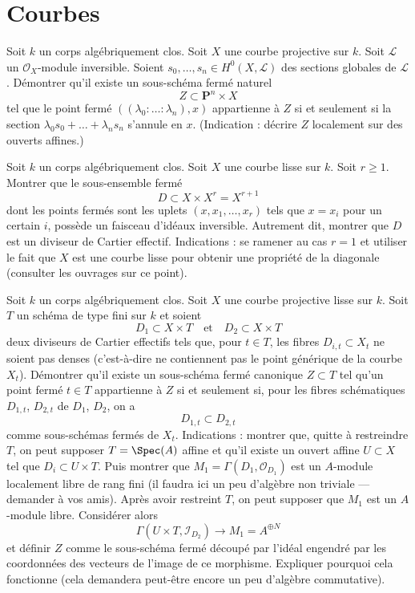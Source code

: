 \section{Courbes}
\label{section-curves}

\begin{exercise}
\label{exercise-closed-subset-vanshing}
Soit $k$ un corps algébriquement clos. Soit $X$ une courbe projective
sur $k$. Soit $\mathcal{L}$ un $\mathcal{O}_X$-module inversible.
Soient $s_0, \ldots, s_n \in H^0(X, \mathcal{L})$
des sections globales de $\mathcal{L}$.
Démontrer qu'il existe un sous-schéma fermé naturel
$$
Z \subset
\mathbf{P}^n \times X
$$
tel que le point fermé
$((\lambda_0 : \ldots : \lambda_n), x)$
appartienne à $Z$ si et seulement si la section
$\lambda_0 s_0 + \ldots + \lambda_n s_n$
s'annule en $x$. (Indication : décrire $Z$ localement sur des ouverts affines.)
\end{exercise}

\begin{exercise}
\label{exercise-diagonal-cartier}
Soit $k$ un corps algébriquement clos. Soit $X$ une courbe lisse sur $k$.
Soit $r \geq 1$. Montrer que le sous-ensemble fermé
$$
D \subset X \times X^r = X^{r + 1}
$$
dont les points fermés sont les uplets $(x, x_1, \ldots, x_r)$ tels que
$x = x_i$ pour un certain $i$, possède un faisceau d'idéaux inversible. Autrement dit,
montrer que
$D$ est un diviseur de Cartier effectif. Indications : se ramener au cas $r = 1$ et
utiliser le fait que $X$ est une courbe lisse pour obtenir une propriété de la diagonale
(consulter les ouvrages sur ce point).
\end{exercise}

\begin{exercise}
\label{exercise-one-divisor-in-another}
Soit $k$ un corps algébriquement clos. Soit $X$ une courbe projective lisse
sur $k$. Soit $T$ un schéma de type fini sur $k$ et soient
$$
D_1 \subset X \times T
\quad\text{et}\quad
D_2 \subset X \times T
$$
deux diviseurs de Cartier effectifs tels que, pour $t \in T$, les
fibres $D_{i, t} \subset X_t$ ne soient pas denses (c'est-à-dire ne contiennent pas
le point générique de la courbe $X_t$).
Démontrer qu'il existe un sous-schéma fermé canonique
$Z \subset T$ tel qu'un point fermé $t \in T$ appartienne à $Z$
si et seulement si, pour les fibres schématiques $D_{1, t}$, $D_{2, t}$
de $D_1$, $D_2$, on a
$$
D_{1, t} \subset D_{2, t}
$$
comme sous-schémas fermés de $X_t$.
Indications : montrer que, quitte à restreindre $T$, on peut
supposer $T = \Spec(A)$ affine et qu'il existe un ouvert affine $U \subset X$
tel que $D_i \subset U \times T$. Puis montrer que
$M_1 = \Gamma(D_1, \mathcal{O}_{D_1})$ est un $A$-module localement libre de rang fini
(il faudra ici un peu d'algèbre non triviale --- demander à vos amis).
Après avoir restreint $T$, on peut supposer que $M_1$ est un $A$-module libre.
Considérer alors
$$
\Gamma(U \times T, \mathcal{I}_{D_2}) \to M_1 = A^{\oplus N}
$$
et définir $Z$ comme le sous-schéma fermé découpé par l'idéal engendré
par les coordonnées des vecteurs de l'image de ce morphisme. Expliquer pourquoi cela fonctionne
(cela demandera peut-être encore un peu d'algèbre commutative).
\end{exercise}

